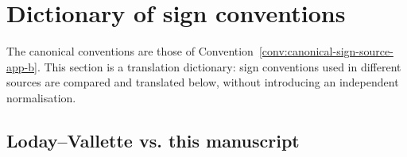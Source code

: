 
\section{Dictionary of sign conventions}
\label{app:sign-conventions}

The canonical conventions are those of
Convention~\ref{conv:canonical-sign-source-app-b}. This section is a
translation dictionary: sign conventions used in different sources are
compared and translated below, without introducing an independent
normalisation.

\subsection{Loday--Vallette vs. this manuscript}

